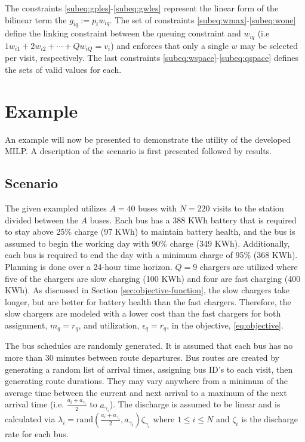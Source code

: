 \documentclass[letterpaper, 10pt, conference]{IEEEtran}
\begin{document}
The constraints \eqref{subeq:gples}-\eqref{subeq:gwles} represent the linear form of the bilinear term the $g_{iq} :=
p_i w_{iq}$. The set of constraints \eqref{subeq:wmax}-\eqref{subeq:wone} define the linking constraint between the
queuing constraint and $w_{iq}$ (i.e $1w_{i1} + 2w_{i2} + \cdots + Qw_{iQ} = v_i$) and enforces that only a single $w$ may be
selected per visit, respectively. The last constraints \eqref{subeq:wspace}-\eqref{subeq:qspace} defines the sets of
valid values for each.



\section{Example}
\label{sec:example}

An example will now be presented to demonstrate the utility of the developed MILP. A description of the scenario is
first presented followed by results.

\subsection{Scenario}
The given exampled utilizes $A = 40$ buses with $N = 220$ visits to the station divided between the $A$ buses. Each bus
has a 388 KWh battery that is required to stay above 25\% charge (97 KWh) to maintain battery health, and the bus is
assumed to begin the working day with 90\% charge (349 KWh). Additionally, each bus is required to end the day with a
minimum charge of 95\% (368 KWh). Planning is done over a 24-hour time horizon. $Q = 9$ chargers are utilized where five
of the chargers are slow charging (100 KWh) and four are fast charging (400 KWh). As discussed in Section
\ref{sec:objective-function}, the slow chargers take longer, but are better for battery health than the fast chargers.
Therefore, the slow chargers are modeled with a lower cost than the fast chargers for both assignment, $m_q = r_q$, and
utilization, $\epsilon_q = r_q$, in the objective, \eqref{eq:objective}.

The bus schedules are randomly generated. It is assumed that each bus has no more than 30 minutes between route
departures. Bus routes are created by generating a random list of arrival times, assigning bus ID's to each visit, then
generating route durations. They may vary anywhere from a minimum of the average time between the current and next
arrival to a maximum of the next arrival time (i.e. $\frac{a_i + a_{\gamma_i}}{2}$ to $a_{\gamma_i}$). The discharge is assumed to
be linear and is calculated via $\lambda_i = \text{rand}(\frac{a_i + a_{\gamma_i}}{2},a_{\gamma_i})\zeta_{\gamma_i}$ where $1 \leq i \leq N$ and $\zeta_i$
is the discharge rate for each bus.
\end{document}
